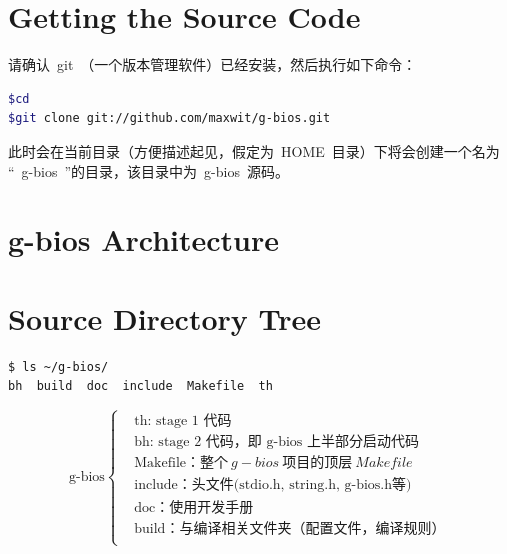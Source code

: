 \documentclass[a4paper,11pt]{book}
\begin{document}
\begin{CJK*}{UTF8}{gbsn}
\section{Getting the Source Code}
请确认~git~（一个版本管理软件）已经安装，然后执行如下命令：
\begin{lstlisting}[language=bash,numbers=none]
$cd
$git clone git://github.com/maxwit/g-bios.git
\end{lstlisting}
此时会在当前目录（方便描述起见，假定为~HOME~目录）下将会创建一个名为 ``~g-bios~''的目录，该目录中为~g-bios~源码。

\section{g-bios Architecture}

\section{Source Directory Tree}
\begin{lstlisting}[language=bash, numbers=none]
$ ls ~/g-bios/
bh  build  doc  include  Makefile  th
\end{lstlisting}

\begin{equation*}
\text{g-bios}
\left\{
	\begin{aligned}
	&\text{th: stage 1~代码} \\
	&\text{bh: stage 2~代码，即~g-bios~上半部分启动代码} \\
	&\text{Makefile：} 整个~g-bios~项目的顶层~Makefile~ \\
	&\text{include：头文件(stdio.h, string.h, g-bios.h等)} \\
	&\text{doc：使用开发手册} \\
	&\text{build：与编译相关文件夹（配置文件，编译规则）} \\
	\end{aligned}
\right.
\end{equation*}



\end{CJK*}
\end{document}
